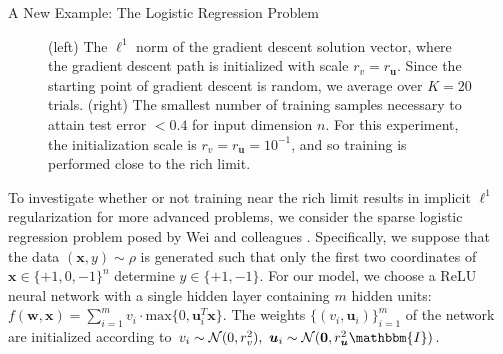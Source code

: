 \documentclass[final, 20pt]{beamer}
\newlength{\colwidth}
\begin{document}
\begin{frame}[t]
\begin{columns}[t]
\begin{column}{\colwidth}
\begin{block}{A New Example: The Logistic Regression Problem}
    \begin{figure}
        \centering
        \hfill
        \hfill
        \caption{(left) The $\ell^1$ norm of the gradient descent solution vector, where the gradient descent path is initialized with scale $r_v = r_{\boldsymbol{u}}$. Since the starting point of gradient descent is random, we average over $K=20$ trials. (right) The smallest number of training samples necessary to attain test error $< 0.4$ for input dimension $n$. For this experiment, the initialization scale is $r_v = r_{\boldsymbol{u}} = 10^{-1}$, and so training is performed close to the rich limit.}
        \label{fig:my_label}
    \end{figure}
    
    To investigate whether or not training near the rich limit results in implicit $\ell^1$ regularization for more advanced problems, we consider the sparse logistic regression problem posed by Wei and colleagues \cite{wei2019regularization}. Specifically, we suppose that the data  $(\boldsymbol{x}, y) \sim \rho$ is generated such that only the first two coordinates of $\boldsymbol{x} \in \{+1, 0, -1\}^n$ determine $y \in \{+1, -1\}$. For our model, we choose a ReLU neural network with a single hidden layer containing $m$ hidden units: $f(\boldsymbol{w}, \boldsymbol{x}) = \sum_{i=1}^m v_i \cdot \text{max}\{0, \boldsymbol{u}_i^T\boldsymbol{x}\}$.
    The weights $\{(v_i, \boldsymbol{u}_i)\}_{i=1}^m$ of the network are initialized according to $v_i \sim \mathcal{N}(0, r_v^2), \ \boldsymbol{u}_i \sim \mathcal{N}(\boldsymbol{0}, r_{\boldsymbol{u}}^2 \mathbbm{I})$.
    

\end{block}
\end{column}
\end{columns}
\end{frame}
\end{document}
